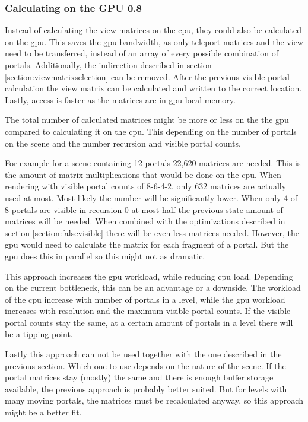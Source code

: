 \subsubsection{Calculating on the GPU 0.8}
Instead of calculating the view matrices on the \gls{cpu}, they could also be calculated on the \gls{gpu}.
This saves the \gls{gpu} bandwidth, as only teleport matrices and the view need to be transferred, instead of an array of every possible combination of portals. Additionally, the indirection described in section \ref{section:viewmatrixselection} can be removed. After the previous visible portal calculation the view matrix can be calculated and written to the correct location. Lastly, access is faster as the matrices are in \gls{gpu} local memory.

The total number of calculated matrices might be more or less on the the \gls{gpu} compared to calculating it on the \gls{cpu}. This  depending on the number of portals on the scene and the number recursion and visible portal counts. 

For example for a scene containing 12 portals 22,620 matrices are needed. This is the amount of matrix multiplications that would be done on the \gls{cpu}. When rendering with visible portal counts of 8-6-4-2, only 632 matrices are actually used at most. Most likely the number will be significantly lower. When only 4 of 8 portals are visible in recursion 0 at most half the previous state amount of matrices will be needed. When combined with the optimizations described in section \ref{section:falsevisible} there will be even less matrices needed. However, the \gls{gpu} would need to calculate the matrix for each fragment of a portal. But the \gls{gpu} does this in parallel so this might not as dramatic. 

This approach increases the \gls{gpu} workload, while reducing \gls{cpu} load. Depending on the current bottleneck, this can be an advantage or a downside. The workload of the \gls{cpu} increase with number of portals in a level, while the \gls{gpu} workload increases with resolution and the maximum visible portal counts. If the visible portal counts stay the same, at a certain amount of portals in a level there will be a tipping point.

Lastly this approach can not be used together with the one described in the previous section. Which one to use depends on the nature of the scene. If the portal matrices stay (mostly) the same and there is enough buffer storage available, the previous approach is probably better suited. But for levels with many moving portals, the matrices must be recalculated anyway, so this approach might be a better fit. 


